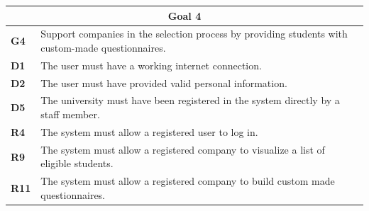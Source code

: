 \begin{table}[H]
    \centering
    \begin{tabular}{|l|m{10cm}|}
        \hline \multicolumn{2}{|c|}{\textbf{Goal 4}} \\
        \hline \textbf{G4} & Support companies in the selection process by providing students with custom-made questionnaires. \\
        \hline \textbf{D1} & The user must have a working internet connection. \\
        \hline \textbf{D2} & The user must have provided valid personal information. \\
        \hline \textbf{D5} & The university must have been registered in the system directly by a staff member. \\
        \hline \textbf{R4} & The system must allow a registered user to log in. \\
        \hline \textbf{R9} & The system must allow a registered company to visualize a list of eligible students. \\
        \hline \textbf{R11} & The system must allow a registered company to build custom made questionnaires. \\

\end{tabular}
\end{table}
